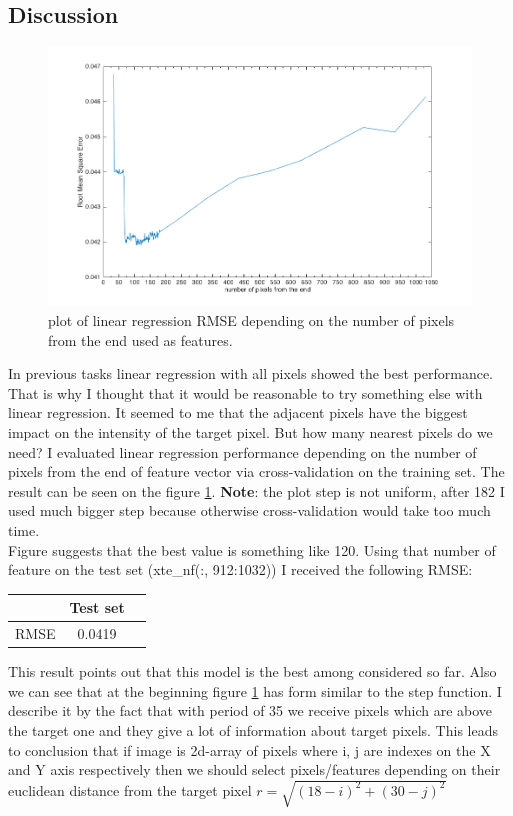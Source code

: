 \documentclass{article}
\begin{document}
		\subsection{Discussion}
		 	\begin{figure}[t]
		 		\centering
		 		\includegraphics[width=17cm]{images/p1-6_num_pixels.png}
		 		\caption{plot of linear regression RMSE depending on the number of pixels from the end  used as features.}
		 		\label{fig:p1-6_num_pixels}
		 	\end{figure}
		 	In previous tasks linear regression with all pixels showed the best performance. That is why I thought that it would be reasonable to try something else with linear regression. It seemed to me that the adjacent pixels have the biggest impact on the intensity of the target pixel. But how many nearest pixels do we need? I evaluated linear regression performance depending on the number of pixels from the end of feature vector via cross-validation on the training set. The result can be seen on the figure \ref{fig:p1-6_num_pixels}. \textbf{Note}: the plot step is not uniform, after 182 I used much bigger step because otherwise cross-validation would take too much time.\\ Figure suggests that the best value is something like 120. Using that number of feature on the test set (xte\_nf(:, 912:1032)) I received the following RMSE:
			\begin{center}
				\begin{tabular}{| c | c | c |}
					\hline
					\, &  Test set \\ \hline
					RMSE & 0.0419 \\ 
					\hline
				\end{tabular}
			\end{center}
			This result points out that this model is the best among considered so far. Also we can see that at the beginning figure \ref{fig:p1-6_num_pixels} has form similar to the step function. I describe it by the fact that with period of 35 we receive pixels which are above the target one and they give a lot of information about target pixels. This leads to conclusion that if image is 2d-array of pixels where i, j are indexes on the X and Y axis respectively then we should select pixels/features depending on their euclidean distance from the target pixel $r = \sqrt{(18 - i)^2 + (30 - j)^2}$
\end{document}
